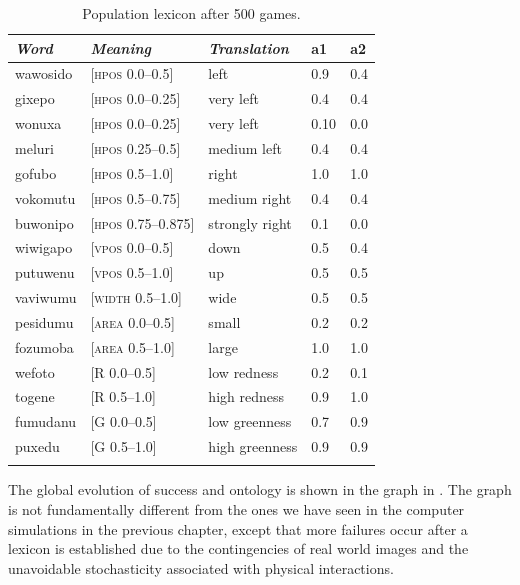 \begin{table}
\begin{center}
\begin{tabular}{lllll}
\lsptoprule
{\itshape Word}&{\itshape Meaning}&{\itshape Translation} & {\bfshape a1}&{\bfshape a2} \\ \midrule
wawosido & [\textsc{hpos} 0.0–0.5] &left&0.9&0.4\\ 
gixepo & [\textsc{hpos} 0.0–0.25] & very left&0.4&0.4\\ 
wonuxa & [\textsc{hpos} 0.0–0.25] & very left&0.10&0.0\\ 
meluri & [\textsc{hpos} 0.25–0.5] &medium left&0.4&0.4\\ 
gofubo & [\textsc{hpos} 0.5–1.0]& right&1.0&1.0\\ 
vokomutu & [\textsc{hpos} 0.5–0.75] &medium right&0.4&0.4\\ 
buwonipo & [\textsc{hpos} 0.75–0.875] &strongly right&0.1&0.0\\ 
wiwigapo & [\textsc{vpos} 0.0–0.5] &down&0.5&0.4\\ 
putuwenu & [\textsc{vpos} 0.5–1.0]&up & 0.5&0.5\\ 
vaviwumu & [\textsc{width} 0.5–1.0]&wide & 0.5&0.5\\ 
pesidumu & [\textsc{area} 0.0–0.5]&small& 0.2&0.2\\ 
fozumoba & [\textsc{area} 0.5–1.0]&large & 1.0&1.0\\ 
wefoto & [R 0.0–0.5]& low redness &0.2&0.1\\ 
togene & [R 0.5–1.0]& high redness &0.9&1.0\\ 
fumudanu & [G 0.0–0.5]& low greenness &0.7&0.9\\ 
puxedu & [G 0.5–1.0]& high greenness &0.9&0.9\\ 
\lspbottomrule
\end{tabular}
\caption{\label{tab:puxedu}Population lexicon after 500 games.}
\end{center}
\end{table}
The global evolution of success and ontology is shown in the 
graph in . The graph is not 
fundamentally different from the ones we have
seen in the computer simulations in the previous
chapter, except that more failures occur after a lexicon
is established due to the contingencies of real 
world images and the unavoidable stochasticity 
associated with physical interactions. 

